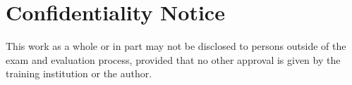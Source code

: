 \chapter*{Confidentiality Notice}
\thispagestyle{scrheadings}
This work as a whole or in part may
not be disclosed to persons outside of the exam and evaluation process,
provided that no other approval is given by the training institution or the author.
\cleardoublepage
